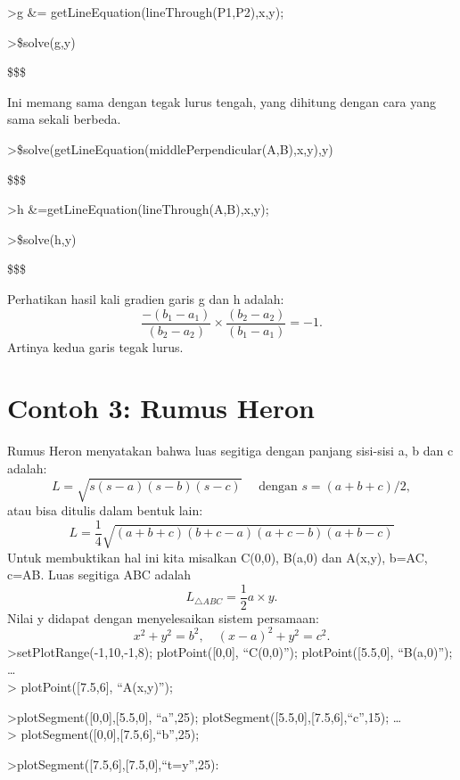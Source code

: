 \documentclass[
]{book}
\begin{document}
\textgreater g \&= getLineEquation(lineThrough(P1,P2),x,y);

\textgreater\$solve(g,y)

\$\left[ y=\frac{-\left(2\,{\it b_1}-2\,{\it a_1}\right)\,x+{\it b_2}  ^2+{\it b_1}^2-{\it a_2}^2-{\it a_1}^2}{2\,{\it b_2}-2\,{\it a_2}}   \right] \$\$

Ini memang sama dengan tegak lurus tengah, yang dihitung dengan cara yang sama sekali berbeda.

\textgreater\$solve(getLineEquation(middlePerpendicular(A,B),x,y),y)

\$\left[ y=\frac{-\left(2\,{\it b_1}-2\,{\it a_1}\right)\,x+{\it b_2}  ^2+{\it b_1}^2-{\it a_2}^2-{\it a_1}^2}{2\,{\it b_2}-2\,{\it a_2}}   \right] \$\$

\textgreater h \&=getLineEquation(lineThrough(A,B),x,y);

\textgreater\$solve(h,y)

\$\left[ y=\frac{\left({\it b_2}-{\it a_2}\right)\,x-{\it a_1}\,  {\it b_2}+{\it a_2}\,{\it b_1}}{{\it b_1}-{\it a_1}} \right] \$\$

Perhatikan hasil kali gradien garis g dan h adalah: \[\frac{-(b_1-a_1)}{(b_2-a_2)}\times \frac{(b_2-a_2)}{(b_1-a_1)} = -1.\]Artinya kedua garis tegak lurus.

\section{Contoh 3: Rumus Heron}\label{contoh-3-rumus-heron}

Rumus Heron menyatakan bahwa luas segitiga dengan panjang sisi-sisi a, b dan c adalah: \[L = \sqrt{s(s-a)(s-b)(s-c)}\quad \text{ dengan } s=(a+b+c)/2,\]atau bisa ditulis dalam bentuk lain: \[L = \frac{1}{4}\sqrt{(a+b+c)(b+c-a)(a+c-b)(a+b-c)}\]Untuk membuktikan hal ini kita misalkan C(0,0), B(a,0) dan A(x,y), b=AC, c=AB. Luas segitiga ABC adalah \[L_{\triangle ABC}=\frac{1}{2}a\times y.\]Nilai y didapat dengan menyelesaikan sistem persamaan: \[x^2+y^2=b^2, \quad (x-a)^2+y^2=c^2.\]\textgreater setPlotRange(-1,10,-1,8); plotPoint({[}0,0{]}, ``C(0,0)''); plotPoint({[}5.5,0{]}, ``B(a,0)''); \ldots{}\\
\textgreater{} plotPoint({[}7.5,6{]}, ``A(x,y)'');

\textgreater plotSegment({[}0,0{]},{[}5.5,0{]}, ``a'',25); plotSegment({[}5.5,0{]},{[}7.5,6{]},``c'',15); \ldots{}\\
\textgreater{} plotSegment({[}0,0{]},{[}7.5,6{]},``b'',25);

\textgreater plotSegment({[}7.5,6{]},{[}7.5,0{]},``t=y'',25):
\end{document}
